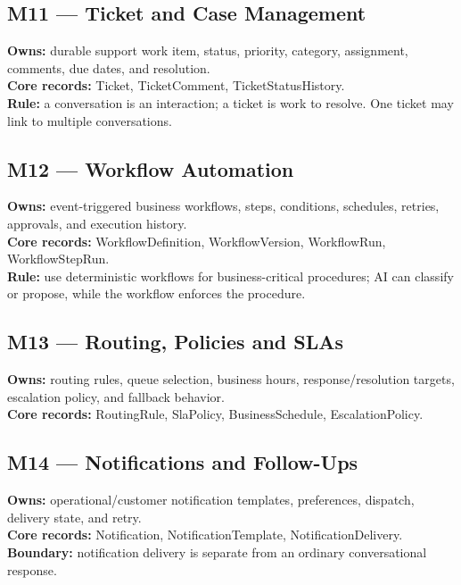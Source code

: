 \subsection{M11 --- Ticket and Case Management}

\textbf{Owns:} durable support work item, status, priority, category, assignment, comments, due dates, and resolution. \\ \textbf{Core records:} Ticket, TicketComment, TicketStatusHistory. \\ \textbf{Rule:} a conversation is an interaction; a ticket is work to resolve. One ticket may link to multiple conversations.

\subsection{M12 --- Workflow Automation}

\textbf{Owns:} event-triggered business workflows, steps, conditions, schedules, retries, approvals, and execution history. \\ \textbf{Core records:} WorkflowDefinition, WorkflowVersion, WorkflowRun, WorkflowStepRun. \\ \textbf{Rule:} use deterministic workflows for business-critical procedures; AI can classify or propose, while the workflow enforces the procedure.

\subsection{M13 --- Routing, Policies and SLAs}

\textbf{Owns:} routing rules, queue selection, business hours, response/resolution targets, escalation policy, and fallback behavior. \\ \textbf{Core records:} RoutingRule, SlaPolicy, BusinessSchedule, EscalationPolicy.

\subsection{M14 --- Notifications and Follow-Ups}

\textbf{Owns:} operational/customer notification templates, preferences, dispatch, delivery state, and retry. \\ \textbf{Core records:} Notification, NotificationTemplate, NotificationDelivery. \\ \textbf{Boundary:} notification delivery is separate from an ordinary conversational response.

